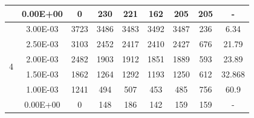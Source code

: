 \begin{table}[H]
{\begin{tabular}{|c|c|c|c|c|c|c|c|c|}
                               & 0.00E+00         & 0         & 230                                                        & 221                                                       & 162                                                       & 205     & 205    & -                                                                  \\ \hline
            \multirow{6}{*}{4} & 3.00E-03         & 3723      & 3486                                                       & 3483                                                      & 3492                                                      & 3487    & 236    & 6.34                                                               \\ \cline{2-9}
                               & 2.50E-03         & 3103      & 2452                                                       & 2417                                                      & 2410                                                      & 2427    & 676    & 21.79                                                              \\ \cline{2-9}
                               & 2.00E-03         & 2482      & 1903                                                       & 1912                                                      & 1851                                                      & 1889    & 593    & 23.89                                                              \\ \cline{2-9}
                               & 1.50E-03         & 1862      & 1264                                                       & 1292                                                      & 1193                                                      & 1250    & 612    & 32.868                                                             \\ \cline{2-9}
                               & 1.00E-03         & 1241      & 494                                                        & 507                                                       & 453                                                       & 485     & 756    & 60.9                                                               \\ \cline{2-9}
                               & 0.00E+00         & 0         & 148                                                        & 186                                                       & 142                                                       & 159     & 159    & -                                                                  \\ \hline

\end{tabular}}
\end{table}
